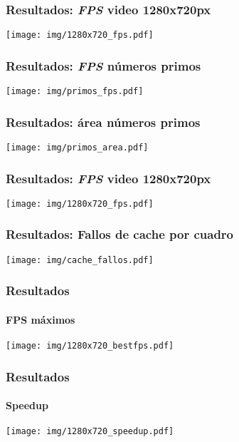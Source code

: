 \documentclass[11pt,a4paper,spanish]{beamer}
\begin{document}
\begin{frame}

\frametitle{Resultados: \emph{FPS} video 1280x720px}

\texttt{[image: img/1280x720\_fps.pdf]}

\end{frame}

\begin{frame}

\frametitle{Resultados: \emph{FPS} números primos}

\texttt{[image: img/primos\_fps.pdf]}

\end{frame}

\begin{frame}

\frametitle{Resultados: área números primos}

\texttt{[image: img/primos\_area.pdf]}

\end{frame}

\begin{frame}

\frametitle{Resultados: \emph{FPS} video 1280x720px}

\texttt{[image: img/1280x720\_fps.pdf]}

\end{frame}

\begin{frame}

\frametitle{Resultados: Fallos de cache por cuadro}

\texttt{[image: img/cache\_fallos.pdf]}

\end{frame}

\begin{frame}

\frametitle{Resultados}

\framesubtitle{FPS máximos}

\texttt{[image: img/1280x720\_bestfps.pdf]}

\end{frame}

\begin{frame}

\frametitle{Resultados}

\framesubtitle{Speedup}

\texttt{[image: img/1280x720\_speedup.pdf]}

\end{frame}
\end{document}
